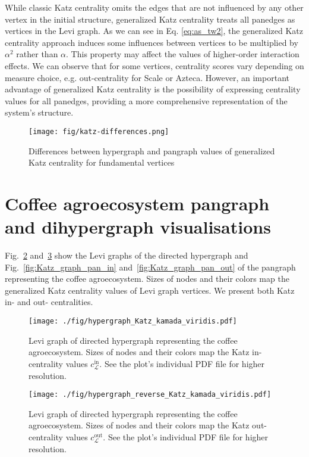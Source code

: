 \documentclass[a4paper,12pt]{article}
\theoremstyle{definition}
\theoremstyle{remark}
\newcommand{\mL}{\mathcal{L}}
\begin{document}
While classic Katz centrality omits the edges that are not influenced by any other vertex in the initial structure, generalized Katz centrality treats all panedges as vertices in the Levi graph. As we can see in Eq. \ref{eq:as_tw2}, the generalized Katz centrality approach induces some influences between vertices to be multiplied by $\alpha^2$ rather than $\alpha$. This property may affect the values of higher-order interaction effects. We can observe that for some vertices, centrality scores vary depending on measure choice, e.g. out-centrality for Scale or Azteca. However, an important advantage of generalized Katz centrality is the possibility of expressing centrality values for all panedges, providing a more comprehensive representation of the system's structure.


\begin{figure}[ht]
    \centering\texttt{[image: fig/katz-differences.png]}
    \caption{Differences between hypergraph and pangraph values of generalized Katz centrality for fundamental vertices}
    \label{fig:katz-diff}
\end{figure}


\section{Coffee agroecosystem pangraph and dihypergraph visualisations}
\label{sec:visualisations}
Fig.~\ref{fig:Katz_graph_hyper_in} and~\ref{fig:Katz_graph_hyper_out} show the Levi graphs of the directed hypergraph and Fig.~\ref{fig:Katz_graph_pan_in} and~\ref{fig:Katz_graph_pan_out} of the pangraph representing the coffee agroecosystem. Sizes of nodes and their colors map the generalized Katz centrality values of Levi graph vertices. We present both Katz in- and out- centralities.

\begin{figure}[ht]
	\begin{center}
        \texttt{[image: ./fig/hypergraph\_Katz\_kamada\_viridis.pdf]}
        \caption{Levi graph of directed hypergraph representing the coffee agroecosystem. Sizes of nodes and their colors map the Katz in-centrality values $c_{\mL}^{\textrm{in}}$. See the plot's individual PDF file for higher resolution.} 
    	\label{fig:Katz_graph_hyper_in}
    \end{center}
\end{figure}

\begin{figure}[ht]
	\begin{center}
        \texttt{[image: ./fig/hypergraph\_reverse\_Katz\_kamada\_viridis.pdf]}
        \caption{Levi graph of directed hypergraph representing the coffee agroecosystem. Sizes of nodes and their colors map the Katz out-centrality values $c_{\mL}^{\textrm{out}}$. See the plot's individual PDF file for higher resolution.} 
    	\label{fig:Katz_graph_hyper_out}
    \end{center}
\end{figure}
\end{document}
